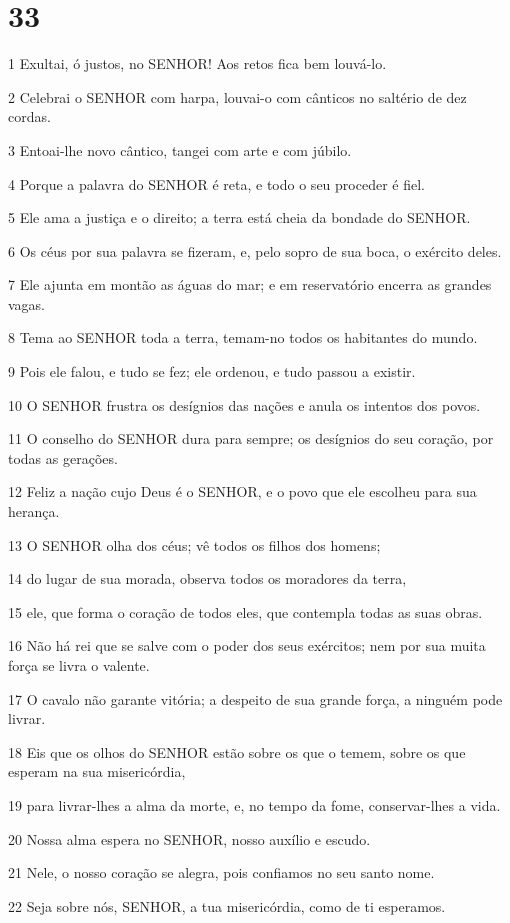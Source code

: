 \chapter{33}

\par 1 Exultai, ó justos, no SENHOR! Aos retos fica bem louvá-lo.
\par 2 Celebrai o SENHOR com harpa, louvai-o com cânticos no saltério de dez cordas.
\par 3 Entoai-lhe novo cântico, tangei com arte e com júbilo.
\par 4 Porque a palavra do SENHOR é reta, e todo o seu proceder é fiel.
\par 5 Ele ama a justiça e o direito; a terra está cheia da bondade do SENHOR.
\par 6 Os céus por sua palavra se fizeram, e, pelo sopro de sua boca, o exército deles.
\par 7 Ele ajunta em montão as águas do mar; e em reservatório encerra as grandes vagas.
\par 8 Tema ao SENHOR toda a terra, temam-no todos os habitantes do mundo.
\par 9 Pois ele falou, e tudo se fez; ele ordenou, e tudo passou a existir.
\par 10 O SENHOR frustra os desígnios das nações e anula os intentos dos povos.
\par 11 O conselho do SENHOR dura para sempre; os desígnios do seu coração, por todas as gerações.
\par 12 Feliz a nação cujo Deus é o SENHOR, e o povo que ele escolheu para sua herança.
\par 13 O SENHOR olha dos céus; vê todos os filhos dos homens;
\par 14 do lugar de sua morada, observa todos os moradores da terra,
\par 15 ele, que forma o coração de todos eles, que contempla todas as suas obras.
\par 16 Não há rei que se salve com o poder dos seus exércitos; nem por sua muita força se livra o valente.
\par 17 O cavalo não garante vitória; a despeito de sua grande força, a ninguém pode livrar.
\par 18 Eis que os olhos do SENHOR estão sobre os que o temem, sobre os que esperam na sua misericórdia,
\par 19 para livrar-lhes a alma da morte, e, no tempo da fome, conservar-lhes a vida.
\par 20 Nossa alma espera no SENHOR, nosso auxílio e escudo.
\par 21 Nele, o nosso coração se alegra, pois confiamos no seu santo nome.
\par 22 Seja sobre nós, SENHOR, a tua misericórdia, como de ti esperamos.

